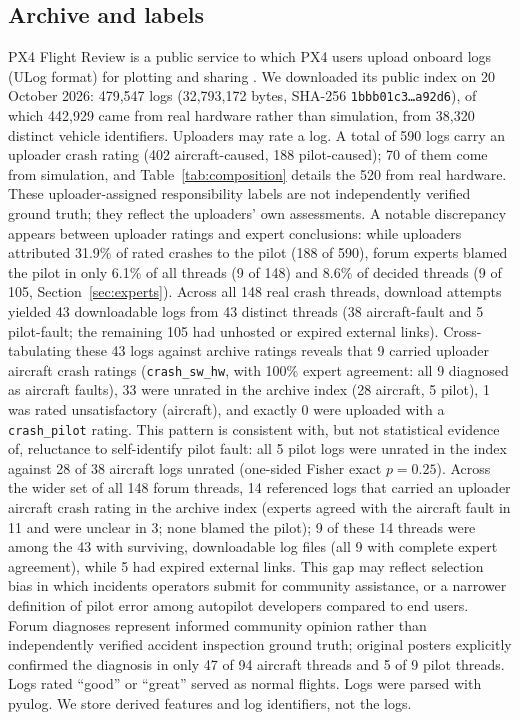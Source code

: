 \documentclass[preprint,12pt]{elsarticle}
\begin{document}
\subsection{Archive and labels}
PX4 Flight Review is a public service to which PX4 users upload onboard logs (ULog format) for plotting and sharing
\cite{px4flightreview}. We downloaded its public index on 20 October 2026: 479,547 logs (32,793,172 bytes,
SHA-256 \texttt{1bbb01c3\ldots a92d6}), of which 442,929 came from real hardware rather than simulation, from 38,320
distinct vehicle identifiers. Uploaders may rate a log. A total of 590 logs carry an uploader crash rating (402
aircraft-caused, 188 pilot-caused); 70 of them come from simulation, and Table~\ref{tab:composition} details the 520 from real
hardware. These uploader-assigned responsibility labels are not independently
verified ground truth; they reflect the uploaders' own assessments. A notable discrepancy appears between uploader ratings
and expert conclusions: while uploaders attributed 31.9\% of rated crashes to the pilot (188 of 590), forum experts blamed
the pilot in only 6.1\% of all threads (9 of 148) and 8.6\% of decided threads (9 of 105, Section~\ref{sec:experts}). Across all
148 real crash threads, download attempts yielded 43 downloadable logs from 43 distinct threads (38 aircraft-fault and 5 pilot-fault;
the remaining 105 had unhosted or expired external links). Cross-tabulating these 43 logs against archive ratings reveals that
9 carried uploader aircraft crash ratings (\texttt{crash\_sw\_hw}, with 100\% expert agreement: all 9 diagnosed as aircraft faults),
33 were unrated in the archive index (28 aircraft, 5 pilot), 1 was rated unsatisfactory (aircraft), and exactly 0 were uploaded
with a \texttt{crash\_pilot} rating. This pattern is consistent with, but not statistical evidence of, reluctance to self-identify
pilot fault: all 5 pilot logs were unrated in the index against 28 of 38 aircraft logs unrated (one-sided Fisher exact $p = 0.25$).
Across the wider set of all 148 forum threads, 14 referenced logs that carried an uploader aircraft crash rating in the archive
index (experts agreed with the aircraft fault in 11 and were unclear in 3; none blamed the pilot); 9 of these 14 threads were among
the 43 with surviving, downloadable log files (all 9 with complete expert agreement), while 5 had expired external links. This gap
may reflect selection bias in which incidents operators submit for community assistance, or a narrower definition of pilot error
among autopilot developers compared to end users. Forum diagnoses represent informed community opinion rather than
independently verified accident inspection ground truth; original posters explicitly confirmed the diagnosis in only 47 of 94 aircraft
threads and 5 of 9 pilot threads.
Logs rated ``good'' or ``great'' served as normal flights. Logs were parsed with pyulog. We store derived features and log identifiers,
not the logs.
\end{document}
